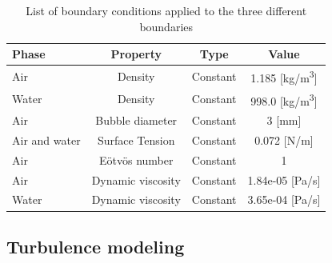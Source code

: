 \documentclass[11pt,a4paper]{article}
\begin{document}
\begin{table}[H]
  \centering
    \begin{tabular}{|p{7em} c c c|}
    \hline
    \rowcolor{bluePoli!40}
    \textbf{Phase} & \textbf{Property} & \textbf{Type} & \textbf{Value} \T\B \\
     \hline \hline 
    Air & Density & Constant & 1.185 [kg/m\textsuperscript{3}] \T\B \\
    Water & Density & Constant & 998.0 [kg/m\textsuperscript{3}] \T\B \\
    Air & Bubble diameter & Constant & 3 [mm] \T\B \\  
    Air and water & Surface Tension & Constant & 0.072 [N/m] \T\B \\   
    Air & E{ö}tv{ö}s number & Constant & 1    \T\B \\ 
    Air & Dynamic viscosity & Constant & 1.84e-05 [Pa/s]    \T\B \\ 
    Water & Dynamic viscosity & Constant & 3.65e-04 [Pa/s]    \T\B \\ 
    \hline
    \end{tabular}%
  \caption{List of boundary conditions applied to the three different boundaries}
  \label{tab:materials}%
\end{table}%



\subsection{Turbulence modeling}
\label{sub:turbmodels}
\end{document}
